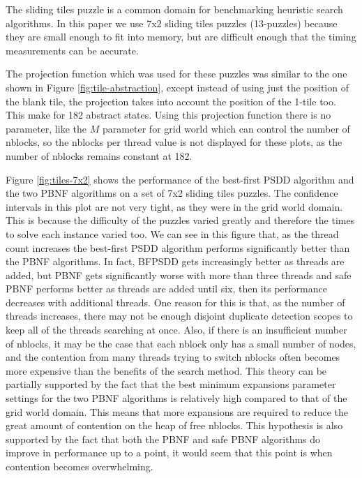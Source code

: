 \documentclass{article}
\begin{document}
The sliding tiles puzzle is a common domain for benchmarking heuristic
search algorithms.  In this paper we use 7x2 sliding tiles puzzles
(13-puzzles) because they are small enough to fit into memory, but are
difficult enough that the timing measurements can be accurate.

The projection function which was used for these puzzles was similar
to the one shown in Figure \ref{fig:tile-abstraction}, except instead
of using just the position of the blank tile, the projection takes
into account the position of the 1-tile too.  This make for 182
abstract states.  Using this projection function there is no
parameter, like the $M$ parameter for grid world which can control the
number of nblocks, so the nblocks per thread value is not displayed
for these plots, as the number of nblocks remains constant at 182.

Figure \ref{fig:tiles-7x2} shows the performance of the best-first
PSDD algorithm and the two PBNF algorithms on a set of 7x2 sliding
tiles puzzles.  The confidence intervals in this plot are not very
tight, as they were in the grid world domain.  This is because the
difficulty of the puzzles varied greatly and therefore the times to
solve each instance varied too.  We can see in this figure that, as
the thread count increases the best-first PSDD algorithm performs
significantly better than the PBNF algorithms.  In fact, BFPSDD gets
increasingly better as threads are added, but PBNF gets significantly
worse with more than three threads and safe PBNF performs better as
threads are added until six, then its performance decreases with
additional threads.  One reason for this is that, as the number of
threads increases, there may not be enough disjoint duplicate
detection scopes to keep all of the threads searching at once.  Also,
if there is an insufficient number of nblocks, it may be the case that
each nblock only has a small number of nodes, and the contention from
many threads trying to switch nblocks often becomes more expensive
than the benefits of the search method.  This theory can be partially
supported by the fact that the best minimum expansions parameter
settings for the two PBNF algorithms is relatively high compared to
that of the grid world domain.  This means that more expansions are
required to reduce the great amount of contention on the heap of free
nblocks.  This hypothesis is also supported by the fact that both the
PBNF and safe PBNF algorithms do improve in performance up to a point,
it would seem that this point is when contention becomes overwhelming.
\end{document}
